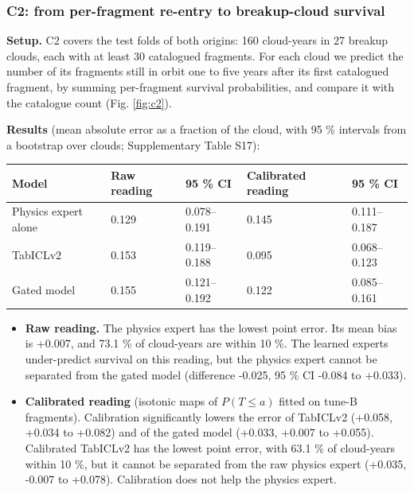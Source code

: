 \documentclass[
]{article}
\newcounter{none} %
\providecommand{\tightlist}{%
  \setlength{\itemsep}{0pt}\setlength{\parskip}{0pt}}
\begin{document}
\subsubsection{C2: from per-fragment re-entry to breakup-cloud
survival}\label{sec:res-c2}

\textbf{Setup.} C2 covers the test folds of both origins: 160
cloud-years in 27 breakup clouds, each with at least 30 catalogued
fragments. For each cloud we predict the number of its fragments still
in orbit one to five years after its first catalogued fragment, by
summing per-fragment survival probabilities, and compare it with the
catalogue count (Fig. \ref{fig:c2}).

\textbf{Results} (mean absolute error as a fraction of the cloud, with
95 \% intervals from a bootstrap over clouds; Supplementary Table S17):

{\def\LTcaptype{none} %
\begin{longtable}[]{@{}lllll@{}}
\toprule\noalign{}
Model & Raw reading & 95 \% CI & Calibrated reading & 95 \% CI \\
\midrule\noalign{}
\endhead
\bottomrule\noalign{}
\endlastfoot
Physics expert alone & 0.129 & 0.078--0.191 & 0.145 & 0.111--0.187 \\
TabICLv2 & 0.153 & 0.119--0.188 & 0.095 & 0.068--0.123 \\
Gated model & 0.155 & 0.121--0.192 & 0.122 & 0.085--0.161 \\
\end{longtable}
}

\begin{itemize}
\tightlist
\item
  \textbf{Raw reading.} The physics expert has the lowest point error.
  Its mean bias is +0.007, and 73.1 \% of cloud-years are within 10 \%.
  The learned experts under-predict survival on this reading, but the
  physics expert cannot be separated from the gated model (difference
  -0.025, 95 \% CI -0.084 to +0.033).
\item
  \textbf{Calibrated reading} (isotonic maps of \(P(T \le a)\) fitted on
  tune-B fragments). Calibration significantly lowers the error of
  TabICLv2 (+0.058, +0.034 to +0.082) and of the gated model (+0.033,
  +0.007 to +0.055). Calibrated TabICLv2 has the lowest point error,
  with 63.1 \% of cloud-years within 10 \%, but it cannot be separated
  from the raw physics expert (+0.035, -0.007 to +0.078). Calibration
  does not help the physics expert.
\end{itemize}
\end{document}

